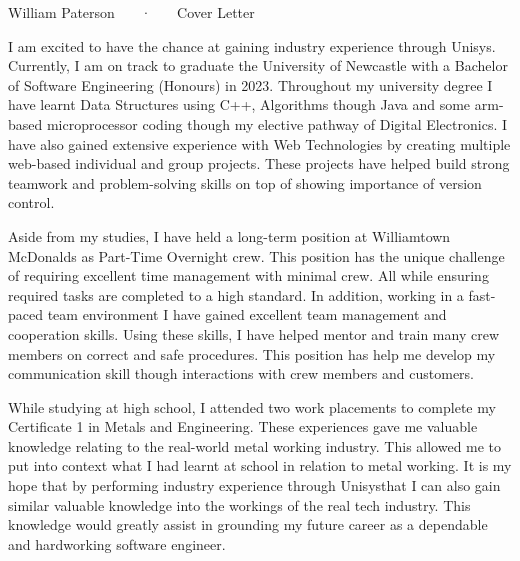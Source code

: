 \documentclass[11pt, a4paper]{awesome-cv}
\newcommand{\companyName}[0]{Unisys}
\begin{document}
\makecvheader[R]

\makecvfooter
  {}
  {William Paterson ~~~·~~~ Cover Letter}
  {}

\makelettertitle

\begin{cvletter} 

I am excited to have the chance at gaining industry experience through \companyName. Currently, I am on track to graduate the University of Newcastle with a Bachelor of Software Engineering (Honours) in 2023. Throughout my university degree I have learnt Data Structures using C++, Algorithms though Java and some arm-based microprocessor coding though my elective pathway of Digital Electronics. I have also gained extensive experience with Web Technologies by creating multiple web-based individual and group projects. These projects have helped build strong teamwork and problem-solving skills on top of showing importance of version control.

Aside from my studies, I have held a long-term position at Williamtown McDonalds as Part-Time Overnight crew. This position has the unique challenge of requiring excellent time management with minimal crew. All while ensuring required tasks are completed to a high standard. In addition, working in a fast-paced team environment I have gained excellent team management and cooperation skills. Using these skills, I have helped mentor and train many crew members on correct and safe procedures. This position has help me develop my communication skill though interactions with crew members and customers.

While studying at high school, I attended two work placements to complete my Certificate 1 in Metals and Engineering. These experiences gave me valuable knowledge relating to the real-world metal working industry. This allowed me to put into context what I had learnt at school in relation to metal working. It is my hope that by performing industry experience through \companyName that I can also gain similar valuable knowledge into the workings of the real tech industry. This knowledge would greatly assist in grounding my future career as a dependable and hardworking software engineer.  


\end{cvletter}


\makeletterclosing
\end{document}
